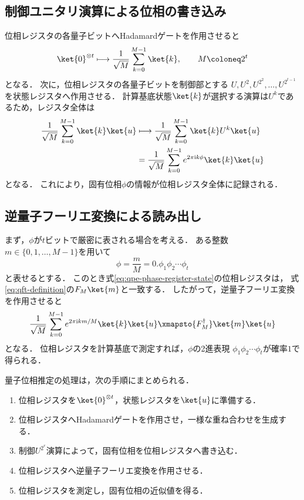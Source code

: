 \subsection{制御ユニタリ演算による位相の書き込み}
\label{subsec:qpe-controlled-unitaries}

位相レジスタの各量子ビットへHadamardゲートを作用させると
\begin{align*}
  \ket{0}^{\otimes t}
  \longmapsto
  \frac{1}{\sqrt{M}}
  \sum_{k=0}^{M-1}\ket{k},
  \qquad
  M\coloneq2^t
\end{align*}
となる．
次に，位相レジスタの各量子ビットを制御部とする
$U,U^2,U^{2^2},\ldots,U^{2^{t-1}}$を状態レジスタへ作用させる．
計算基底状態$\ket{k}$が選択する演算は$U^k$であるため，レジスタ全体は
\begin{align}
  \frac{1}{\sqrt{M}}
  \sum_{k=0}^{M-1}\ket{k}\ket{u}
  &\longmapsto
  \frac{1}{\sqrt{M}}
  \sum_{k=0}^{M-1}\ket{k}U^k\ket{u}\notag\\
  &=
  \frac{1}{\sqrt{M}}
  \sum_{k=0}^{M-1}
  e^{2\pi\mathrm{i}k\phi}\ket{k}\ket{u}
  \label{eq:qpe-phase-register-state}
\end{align}
となる．
これにより，固有位相$\phi$の情報が位相レジスタ全体に記録される．

\subsection{逆量子フーリエ変換による読み出し}
\label{subsec:qpe-inverse-qft-readout}

まず，$\phi$が$t$ビットで厳密に表される場合を考える．
ある整数$m\in\{0,1,\ldots,M-1\}$を用いて
\begin{equation}
  \phi
  =
  \frac{m}{M}
  =
  0.\phi_1\phi_2\cdots\phi_t
  \label{eq:qpe-exact-binary-phase}
\end{equation}
と表せるとする．
このとき式\eqref{eq:qpe-phase-register-state}の位相レジスタは，
式\eqref{eq:qft-definition}の$F_M\ket{m}$と一致する．
したがって，逆量子フーリエ変換を作用させると
\begin{equation}
  \frac{1}{\sqrt{M}}
  \sum_{k=0}^{M-1}e^{2\pi\mathrm{i}km/M}\ket{k}\ket{u}
  \xmapsto{F_M^{\dagger}}
  \ket{m}\ket{u}
  \label{eq:qpe-exact-output}
\end{equation}
となる．
位相レジスタを計算基底で測定すれば，$\phi$の2進表現
$\phi_1\phi_2\cdots\phi_t$が確率$1$で得られる．

量子位相推定の処理は，次の手順にまとめられる．

\begin{enumerate}[(1)]
  \item 位相レジスタを$\ket{0}^{\otimes t}$，状態レジスタを$\ket{u}$に準備する．
  \item 位相レジスタへHadamardゲートを作用させ，一様な重ね合わせを生成する．
  \item 制御$U^{2^r}$演算によって，固有位相を位相レジスタへ書き込む．
  \item 位相レジスタへ逆量子フーリエ変換を作用させる．
  \item 位相レジスタを測定し，固有位相の近似値を得る．
\end{enumerate}

